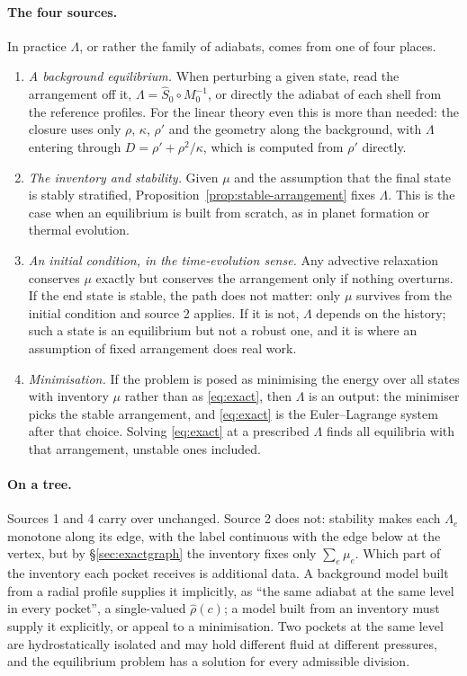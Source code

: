 \documentclass[11pt]{article}
\theoremstyle{definition}
\theoremstyle{remark}
\begin{document}
\paragraph{The four sources.} In practice $\Lambda$, or rather the
family of adiabats, comes from one of four places.
\begin{enumerate}
\item \emph{A background equilibrium.} When perturbing a given state,
  read the arrangement off it, $\Lambda = \hat S_0\circ M_0^{-1}$, or
  directly the adiabat of each shell from the reference profiles. For
  the linear theory even this is more than needed: the closure uses
  only $\rho$, $\kappa$, $\rho'$ and the geometry along the background,
  with $\Lambda$ entering through $D = \rho' + \rho^2/\kappa$, which is
  computed from $\rho'$ directly.
\item \emph{The inventory and stability.} Given $\mu$ and the
  assumption that the final state is stably stratified,
  Proposition~\ref{prop:stable-arrangement} fixes $\Lambda$. This is
  the case when an equilibrium is built from scratch, as in planet
  formation or thermal evolution.
\item \emph{An initial condition, in the time-evolution sense.} Any
  advective relaxation conserves $\mu$ exactly but conserves the
  arrangement only if nothing overturns. If the end state is stable,
  the path does not matter: only $\mu$ survives from the initial
  condition and source 2 applies. If it is not, $\Lambda$ depends on
  the history; such a state is an equilibrium but not a robust one,
  and it is where an assumption of fixed arrangement does real work.
\item \emph{Minimisation.} If the problem is posed as minimising the
  energy over all states with inventory $\mu$ rather than as
  \eqref{eq:exact}, then $\Lambda$ is an output: the minimiser picks
  the stable arrangement, and \eqref{eq:exact} is the Euler--Lagrange
  system after that choice. Solving \eqref{eq:exact} at a prescribed
  $\Lambda$ finds all equilibria with that arrangement, unstable ones
  included.
\end{enumerate}

\paragraph{On a tree.} Sources 1 and 4 carry over unchanged. Source 2
does not: stability makes each $\Lambda_e$ monotone along its edge,
with the label continuous with the edge below at the vertex, but by
\S\ref{sec:exactgraph} the inventory fixes only $\sum_e\mu_e$. Which
part of the inventory each pocket receives is additional data. A
background model built from a radial profile supplies it implicitly,
as ``the same adiabat at the same level in every pocket'', a
single-valued $\hat\rho(c)$; a model built from an inventory must
supply it explicitly, or appeal to a minimisation. Two pockets at the
same level are hydrostatically isolated and may hold different fluid
at different pressures, and the equilibrium problem has a solution for
every admissible division.
\end{document}
